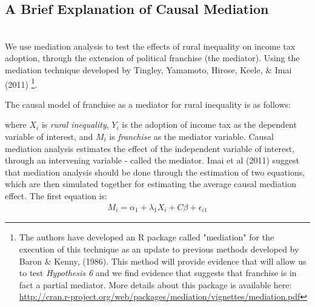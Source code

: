 \documentclass[letter, 12pt]{article}
\begin{document}
\subsection{A Brief Explanation of Causal Mediation}\hfill\\

We use mediation analysis to test the effects of rural inequality on income tax adoption, through the extension of political franchise (the mediator). Using the mediation technique developed by Tingley, Yamamoto, Hirose, Keele, \& Imai (2011) \footnote{The authors have developed an R package called "mediation" for the execution of this technique as an update to previous methods developed by Baron \& Kenny, (1986). This method will provide evidence that will allow us to test \emph{Hypothesis 6} and we find evidence that suggests that franchise is in fact a partial mediator. More details about this package is available here: \hyperlink{http://cran.r-project.org/web/packages/mediation/vignettes/mediation.pdf}{http://cran.r-project.org/web/packages/mediation/vignettes/mediation.pdf}}. %

The causal model of franchise as a mediator for rural inequality is as follows: 

\begin{center}
\end{center}

where $X_i$ is \emph{rural inequality}, $Y_i$ is the adoption of income tax as the dependent variable of interest, and $M_i$ is \emph{franchise} as the mediator variable. Causal mediation analysis estimates the effect of the independent variable of interest, through an intervening variable - called the mediator. Imai et al (2011) suggest that mediation analysis should be done through the estimation of two equations, which are then simulated together for estimating the average causal mediation effect. The first equation is: 
\begin{align}
M_i = \alpha_1 + \lambda_1 X_i + C \beta + \epsilon_{i1}
\end{align}
\end{document}
